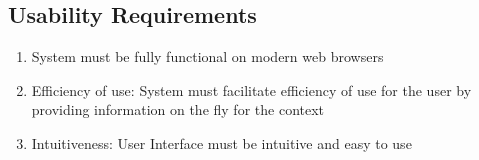 \subsection{Usability Requirements} %
\label{sub:usability_requirements}
\begin{enumerate}
	\item System must be fully functional on modern web browsers
	\item Efficiency of use: System must facilitate efficiency of use for the user by providing information on the fly for the context
	\item Intuitiveness: User Interface must be intuitive and easy to use
\end{enumerate}
